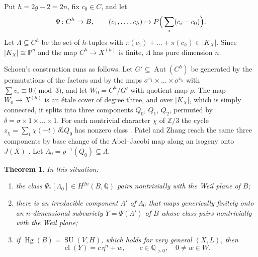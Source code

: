 \documentclass[11pt]{amsart}
\newtheorem{theorem}{Theorem}[section]
\theoremstyle{definition}
\theoremstyle{remark}
\newcommand{\QQ}{\mathbb{Q}}
\newcommand{\ZZ}{\mathbb{Z}}
\newcommand{\PP}{\mathbb{P}}
\newcommand{\Hg}{\operatorname{Hg}}
\newcommand{\SU}{\operatorname{SU}}
\newcommand{\cl}{\operatorname{cl}}
\begin{document}
Put $h=2g-2=2n$, fix $c_{0}\in C$, and let
\[
  \Psi\colon C^{h}\to B,\qquad (c_{1},\dots,c_{h})\mapsto
  P\Bigl(\,\sum_{i}(c_{i}-c_{0})\Bigr).
\]
Let $\Lambda\subseteq C^{h}$ be the set of $h$-tuples with
$\pi(c_{1})+\dots+\pi(c_{h})\in|K_{X}|$. Since $|K_{X}|\cong\PP^{n}$ and the
map $C^{h}\to X^{(h)}$ is finite, $\Lambda$ has pure dimension $n$.

Schoen's construction \cite[Section~2, case $r=0$]{Sch88} runs as follows. Let
$G'\subseteq\operatorname{Aut}(C^{h})$ be generated by the permutations of the
factors and by the maps $\sigma^{v_{1}}\times\dots\times\sigma^{v_{h}}$ with
$\sum v_{i}\equiv0\pmod3$, and let $W_{0}=C^{h}/G'$ with quotient map $\rho$.
The map $W_{0}\to X^{(h)}$ is an \'etale cover of degree three, and over
$|K_{X}|$, which is simply connected, it splits into three components $Q_{0}$,
$Q_{1}$, $Q_{2}$, permuted by $\delta=\sigma\times1\times\dots\times1$. For
each nontrivial character $\chi$ of $\ZZ/3$ the cycle
$z_{\chi}=\sum_{t}\chi(-t)\,\delta^{t}_{*}Q_{0}$ has nonzero class
\cite[proof of Theorem~2.0]{Sch88}. Patel and Zhang reach the same three
components by base change of the Abel--Jacobi map along an isogeny onto
$J(X)$ \cite[Theorem~1.1]{PZ25}. Let $\Lambda_{0}=\rho^{-1}(Q_{0})\subseteq
\Lambda$.

\begin{theorem}\label{thm:schoensub}
In this situation:
\begin{enumerate}[label=(\alph*)]
\item the class $\Psi_{*}[\Lambda_{0}]\in H^{2n}(B,\QQ)$ pairs nontrivially
with the Weil plane of $B$;
\item there is an irreducible component $\Lambda'$ of $\Lambda_{0}$ that
maps generically finitely onto an $n$-dimensional subvariety $Y=\Psi(\Lambda')$
of $B$ whose class pairs nontrivially with the Weil plane;
\item if $\Hg(B)=\SU(V,H)$, which holds for very general $(X,L)$, then
\[
  \cl(Y)=c\,\eta^{n}+w,\qquad c\in\QQ_{>0},\quad 0\ne w\in W.
\]
\end{enumerate}
\end{theorem}
\end{document}

